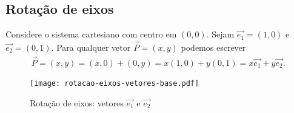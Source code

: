 \subsection{Rota\c{c}\~ao de eixos} %
\label{sub:rotacao_de_eixos}

Considere o sistema cartesiano com centro em $(0,0)$. Sejam $\vec{e_1} = (1,0)$ e $\vec{e_2} = (0,1)$. Para qualquer vetor $\vec{P} = (x,y)$ podemos escrever
\begin{align}\label{equacaoxy}
  \vec{P} = (x,y) = (x,0) + (0,y) = x(1,0) + y(0,1) = x\vec{e_1} + y\vec{e_2}.
\end{align}

\begin{figure}[!h]
  \centering
  \caption{Rota\c{c}\~ao de eixos: vetores $\vec{e_1}$ e $\vec{e_2}$}
  \texttt{[image: rotacao-eixos-vetores-base.pdf]}


\end{figure}

